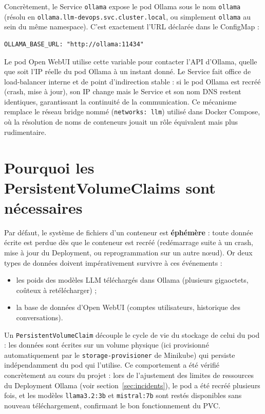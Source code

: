 ﻿\documentclass[11pt,a4paper]{article}
\begin{document}
Concrètement, le Service \texttt{ollama} expose le pod Ollama sous le nom \texttt{ollama} (résolu en \texttt{ollama.\allowbreak llm-devops.\allowbreak svc.\allowbreak cluster.\allowbreak local}, ou simplement \texttt{ollama} au sein du même namespace). C'est exactement l'URL déclarée dans le ConfigMap :

\begin{lstlisting}
OLLAMA_BASE_URL: "http://ollama:11434"
\end{lstlisting}

Le pod Open WebUI utilise cette variable pour contacter l'API d'Ollama, quelle que soit l'IP réelle du pod Ollama à un instant donné. Le Service fait office de load-balancer interne et de point d'indirection stable : si le pod Ollama est recréé (crash, mise à jour), son IP change mais le Service et son nom DNS restent identiques, garantissant la continuité de la communication. Ce mécanisme remplace le réseau bridge nommé (\texttt{networks: llm}) utilisé dans Docker Compose, où la résolution de noms de conteneurs jouait un rôle équivalent mais plus rudimentaire.

\section{Pourquoi les PersistentVolumeClaims sont nécessaires}
\label{sec:pvc}

Par défaut, le système de fichiers d'un conteneur est \textbf{éphémère} : toute donnée écrite est perdue dès que le conteneur est recréé (redémarrage suite à un crash, mise à jour du Deployment, ou reprogrammation sur un autre nœud). Or deux types de données doivent impérativement survivre à ces événements :

\begin{itemize}[nosep]
    \item les poids des modèles LLM téléchargés dans Ollama (plusieurs gigaoctets, coûteux à retélécharger) ;
    \item la base de données d'Open WebUI (comptes utilisateurs, historique des conversations).
\end{itemize}

Un \texttt{PersistentVolumeClaim} découple le cycle de vie du stockage de celui du pod : les données sont écrites sur un volume physique (ici provisionné automatiquement par le \texttt{storage-provisioner} de Minikube) qui persiste indépendamment du pod qui l'utilise. Ce comportement a été vérifié concrètement au cours du projet : lors de l'ajustement des limites de ressources du Deployment Ollama (voir section~\ref{sec:incidents}), le pod a été recréé plusieurs fois, et les modèles \texttt{llama3.2:3b} et \texttt{mistral:7b} sont restés disponibles sans nouveau téléchargement, confirmant le bon fonctionnement du PVC.
\end{document}
